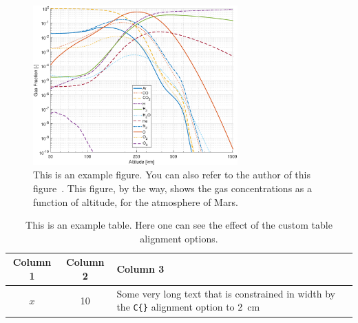 \begin{figure}[b!]
	\centering
	\includegraphics[width=0.7\textwidth]{figures/composition}
	\caption[This is an example figure.]{This is an example figure. You can also refer to the author of this figure~\citep{MST001}. This figure, by the way, shows the gas concentrations as a function of altitude, for the atmosphere of Mars.}
	\label{fig:figure}
\end{figure}

\begin{table}[htb!]
	\centering
	\caption[This is an example table.]{This is an example table. Here one can see the effect of the custom table alignment options.}
	\label{tab:table}
	\begin{tabular}{ccC{2cm}}
		\toprule
		\textbf{Column 1} & \textbf{Column 2} & \textbf{Column 3} \\
		\midrule
		$x$ & 10 & Some very long text that is constrained in width by the \verb|C{}| alignment option to \SI{2}{\centi\meter} \\
		\bottomrule
	\end{tabular}
\end{table}

